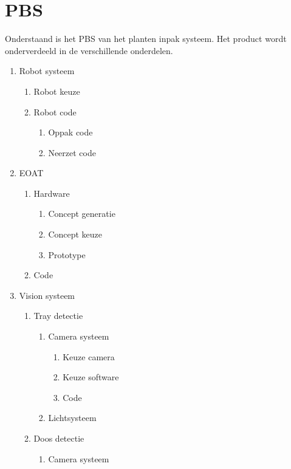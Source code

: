 \section*{PBS}

Onderstaand is het PBS van het planten inpak systeem. Het product wordt onderverdeeld in de verschillende onderdelen.

\begin{enumerate}[label*=\arabic*.]
	\item Robot systeem
	\begin{enumerate}[label*=\arabic*.]
		\item Robot keuze
		\item Robot code
		\begin{enumerate}[label*=\arabic*.]
			\item Oppak code
			\item Neerzet code
		\end{enumerate}
	\end{enumerate}
	\item EOAT
	\begin{enumerate}[label*=\arabic*.]
		\item Hardware
		\begin{enumerate}[label*=\arabic*.]
			\item Concept generatie
			\item Concept keuze
			\item Prototype
		\end{enumerate}
		\item Code
	\end{enumerate}
	\item Vision systeem
	\begin{enumerate}[label*=\arabic*.]
		\item Tray detectie
		\begin{enumerate}[label*=\arabic*.]
			\item Camera systeem
			\begin{enumerate}[label*=\arabic*.]
				\item Keuze camera
				\item Keuze software
				\item Code
			\end{enumerate}
			\item Lichtsysteem
		\end{enumerate}
		\item Doos detectie
			\begin{enumerate}[label*=\arabic*.]
				\item Camera systeem

\end{enumerate}
\end{enumerate}
\end{enumerate}
